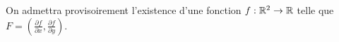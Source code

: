 \documentclass{tp_um}
\begin{document}
On admettra provisoirement l'existence d'une fonction $f:\mathbb{R}^2 \to \mathbb{R}$ telle que $F = (\frac{\partial f}{\partial x} , \frac{\partial f}{\partial y})$.
\end{document}
